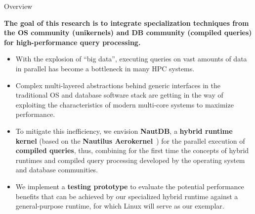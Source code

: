 



\begin{block}{Overview}
\begin{overviewbox}
    \textbf{The goal of this research is to integrate specialization techniques from the OS community
      (unikernels) and  DB community (compiled queries) for high-performance query processing.}
\end{overviewbox}
  \begin{itemize}
  \item   With the explosion of ``big data'', executing queries on vast amounts of data in parallel has become a bottleneck in many HPC systems.
  \item   Complex multi-layered abstractions behind generic interfaces in the traditional OS and database software stack are getting in the way of exploiting the characteristics of modern multi-core systems to maximize performance.
  \item   To mitigate this inefficiency, we envision \textbf{NautDB}, a \textbf{hybrid runtime kernel} (based on the \textbf{Nautilus Aerokernel}~\cite{HALE:2015:NAUTILUS}) for the parallel execution of \textbf{compiled queries}, thus, combining for the first time the concepts of hybrid runtimes and compiled query processing developed by the operating system and database communities.
  \item   We implement a \textbf{testing prototype} to evaluate the potential performance benefits that can be achieved by our specialized hybrid runtime against a general-purpose runtime, for which Linux will serve as our exemplar.
  \end{itemize}
\end{block}

